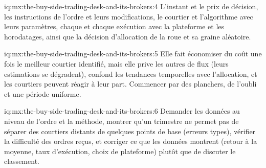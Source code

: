 \begin{solution}{iq:mx:the-buy-side-trading-desk-and-its-brokers:4}
L'instant et le prix de décision, les instructions de l'ordre et leurs modifications, le courtier et l'algorithme avec leurs paramètres, chaque  et chaque exécution avec la
plateforme et les horodatages, ainsi que la décision d'allocation de la roue et sa graine aléatoire.
\end{solution}

\begin{solution}{iq:mx:the-buy-side-trading-desk-and-its-brokers:5}
Elle fait économiser du coût une fois le meilleur courtier identifié, mais elle prive les autres de flux (leurs estimations se dégradent), confond les tendances temporelles avec l'allocation, et
les courtiers peuvent réagir à leur part. Commencer par des planchers, de l'oubli et une période uniforme.
\end{solution}

\begin{solution}{iq:mx:the-buy-side-trading-desk-and-its-brokers:6}
Demander les données au niveau de l'ordre et la méthode, montrer qu'un trimestre ne permet pas de séparer des courtiers distants de quelques points de base (erreurs types), vérifier la
difficulté des ordres reçus, et corriger ce que les données montrent (retour à la moyenne, taux d'exécution, choix de plateforme) plutôt que de discuter le classement.
\end{solution}
